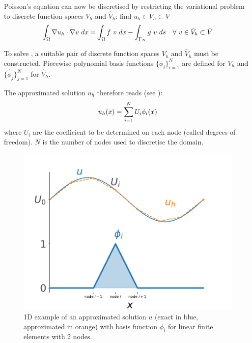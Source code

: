 Poisson's equation can now be discretised by restricting the variational problem  to discrete function spaces $V_h$ and $\hat{V}_h$: find $u_h \in V_h \subset V$
\begin{equation}
    \int_{\Omega} \nabla u_h \cdot \nabla v  \ dx = \int_{\Omega} f \ v \ dx - \int_{\Gamma_N} g \ v \ ds \quad \forall \ v \in \hat{V}_h \subset \hat{V}
    \labeq{discrete variational problem}
\end{equation}

To solve , a suitable pair of discrete function spaces $V_h$ and $\hat{V}_h$ must be constructed.
Piecewise polynomial basis functions $\{ \phi_i \}_{i=1}^N$ are defined for $V_h$ and $\{ \hat{\phi}_j \}_{j=1}^N$ for $\hat{V}_h$.

The approximated solution $u_h$ therefore reads (see ):
\begin{equation}
    u_h(x) = \sum^N_{i=1}U_i \phi_i(x)
    \labeq{FEM solution}
\end{equation}
where $U_i$ are the coefficient to be determined on each node (called degrees of freedom).
$N$ is the number of nodes used to discretise the domain.

\begin{figure}
    \centering
    \includegraphics[width=\linewidth]{Figures/Chapter2/approximated_solution.pdf}
    \caption{1D example of an approximated solution $u$ (exact in blue, approximated in orange) with basis function $\phi_i$ for linear finite elements with 2 nodes.}
\end{figure}

